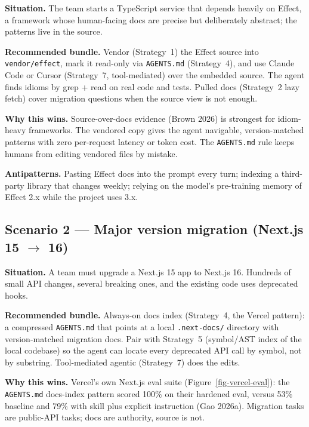\documentclass[
  11pt,
  letterpaper,
  numbers=noendperiod,
  parskip=half]{scrartcl}
\begin{document}
\textbf{Situation.} The team starts a TypeScript service that depends
heavily on Effect, a framework whose human-facing docs are precise but
deliberately abstract; the patterns live in the source.

\textbf{Recommended bundle.} Vendor (Strategy~1) the Effect source into
\texttt{vendor/effect}, mark it read-only via \texttt{AGENTS.md}
(Strategy~4), and use Claude Code or Cursor (Strategy~7,
tool-mediated) over the embedded source. The agent finds idioms by
grep + read on real code and tests. Pulled docs (Strategy~2 lazy
fetch) cover migration questions when the source view is not enough.

\textbf{Why this wins.} Source-over-docs evidence (Brown 2026) is
strongest for idiom-heavy frameworks. The vendored copy gives the
agent navigable, version-matched patterns with zero per-request
latency or token cost. The \texttt{AGENTS.md} rule keeps humans from
editing vendored files by mistake.

\textbf{Antipatterns.} Pasting Effect docs into the prompt every turn;
indexing a third-party library that changes weekly; relying on the
model's pre-training memory of Effect 2.x while the project uses 3.x.

\subsection{Scenario 2 --- Major version migration (Next.js
15 \texorpdfstring{$\to$}{->} 16)}\label{sec-fit-scenario-nextjs}

\textbf{Situation.} A team must upgrade a Next.js 15 app to Next.js
16. Hundreds of small API changes, several breaking ones, and the
existing code uses deprecated hooks.

\textbf{Recommended bundle.} Always-on docs index (Strategy~4, the
Vercel pattern): a compressed \texttt{AGENTS.md} that points at a
local \texttt{.next-docs/} directory with version-matched migration
docs. Pair with Strategy~5 (symbol/AST index of the local codebase) so
the agent can locate every deprecated API call by symbol, not by
substring. Tool-mediated agentic (Strategy~7) does the edits.

\textbf{Why this wins.} Vercel's own Next.js eval suite
(Figure~\ref{fig-vercel-eval}): the \texttt{AGENTS.md} docs-index
pattern scored 100\% on their hardened eval, versus 53\% baseline and
79\% with skill plus explicit instruction (Gao 2026a). Migration tasks
are public-API tasks; docs are authority, source is not.
\end{document}
